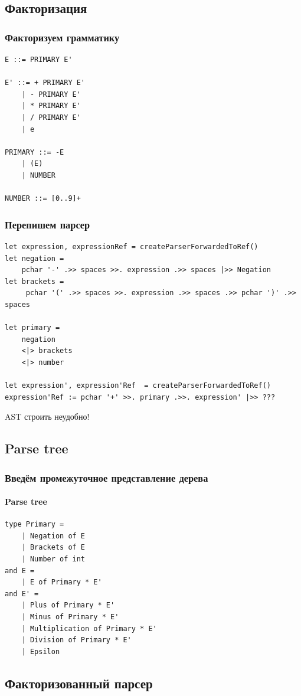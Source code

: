\documentclass[xetex,mathserif,serif]{beamer}
\begin{document}
    \subsection{Факторизация}

    \begin{frame}[fragile]
        \frametitle{Факторизуем грамматику}
        \begin{verbatim}
E ::= PRIMARY E'

E' ::= + PRIMARY E'
    | - PRIMARY E'
    | * PRIMARY E'
    | / PRIMARY E'
    | e

PRIMARY ::= -E
    | (E)
    | NUMBER

NUMBER ::= [0..9]+
        \end{verbatim}
    \end{frame}

    \begin{frame}[fragile]
        \frametitle{Перепишем парсер}
        \begin{verbatim}
let expression, expressionRef = createParserForwardedToRef()
let negation = 
    pchar '-' .>> spaces >>. expression .>> spaces |>> Negation
let brackets =
     pchar '(' .>> spaces >>. expression .>> spaces .>> pchar ')' .>> spaces 

let primary = 
    negation
    <|> brackets
    <|> number

let expression', expression'Ref  = createParserForwardedToRef()
expression'Ref := pchar '+' >>. primary .>>. expression' |>> ???
        \end{verbatim}
        AST строить неудобно!
    \end{frame}

    \subsection{Parse tree}

    \begin{frame}[fragile]
        \frametitle{Введём промежуточное представление дерева}
        \framesubtitle{Parse tree}
        \begin{verbatim}
type Primary =
    | Negation of E
    | Brackets of E
    | Number of int
and E = 
    | E of Primary * E'
and E' =
    | Plus of Primary * E'
    | Minus of Primary * E'
    | Multiplication of Primary * E'
    | Division of Primary * E'
    | Epsilon
        \end{verbatim}
    \end{frame}

    \subsection{Факторизованный парсер}
\end{document}
